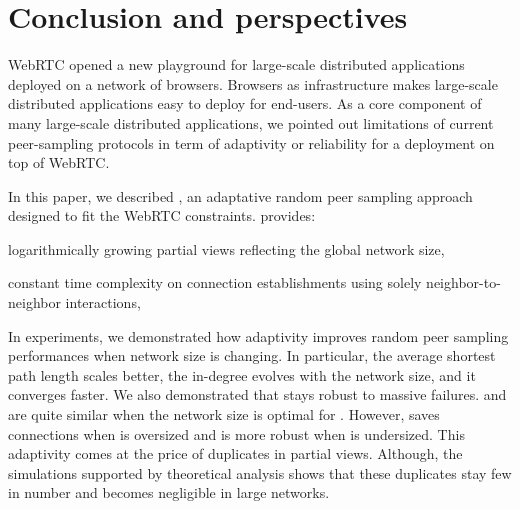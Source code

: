 
\section{Conclusion and perspectives}
\label{sec:conclusion}

WebRTC opened a new playground for large-scale distributed
applications deployed on a network of browsers. Browsers as
infrastructure makes large-scale distributed applications easy to
deploy for end-users. As a core component of many large-scale
distributed applications, we pointed out limitations of current
peer-sampling protocols in term of adaptivity or reliability for a
deployment on top of WebRTC. 

In this paper, we described \SPRAY, an adaptative random peer sampling
approach designed to fit the WebRTC constraints.  \SPRAY provides:
\begin{inparaenum}[(i)]
\item logarithmically growing partial views reflecting the global network size,
\item constant time complexity on connection establishments using solely
  neighbor-to-neighbor interactions,
\end{inparaenum}

In experiments, we demonstrated how \SPRAY adaptivity improves random
peer sampling performances when network size is changing. In
particular, the average shortest path length scales better, the
in-degree evolves with the network size, and it converges faster.  We
also demonstrated that \SPRAY stays robust to massive failures. \SPRAY
and \CYCLON are quite similar when the network size is optimal for
\CYCLON. However, \SPRAY saves connections when \CYCLON is oversized
and is more robust when \CYCLON is undersized. This adaptivity comes
at the price of duplicates in partial views. Although, the simulations
supported by theoretical analysis shows that these duplicates stay few
in number and becomes negligible in large networks.




